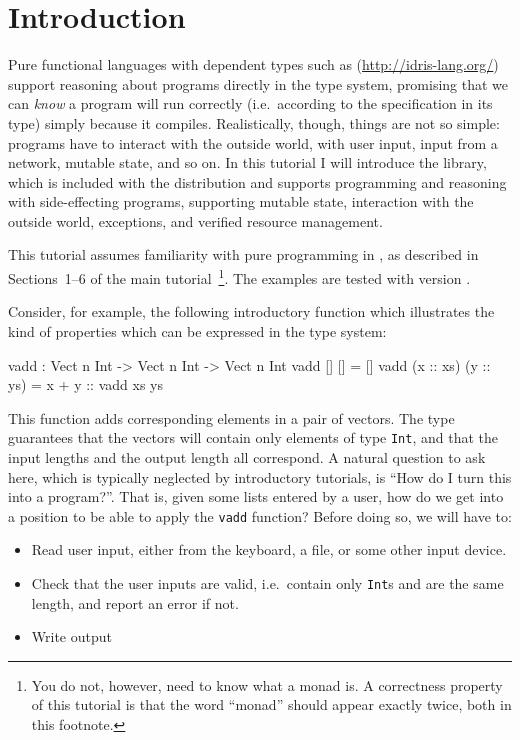 \section{Introduction}

Pure functional languages with dependent types such as \Idris{} (\url{http://idris-lang.org/}) support reasoning about programs directly in the type system, promising that we can \emph{know} a program will run correctly (i.e.\ according to the specification in its type) simply because it compiles.
Realistically, though, things are not so simple: programs have to interact with the outside world, with user input, input from a network, mutable state, and so on.
In this tutorial I will introduce the \effects{} library, which is included with the \Idris{} distribution and supports programming and reasoning with side-effecting programs, supporting mutable state, interaction with the outside world, exceptions, and verified resource management.

This tutorial assumes familiarity with pure programming in \Idris{}, as described in Sections~1--6 of the main tutorial~\cite{idris-tutorial}\footnote{You do not, however, need to know what a monad is. A correctness property of this tutorial is that the word ``monad'' should appear exactly twice, both in this footnote.}.
The examples are tested with \Idris{} version \version{}.

Consider, for example, the following introductory function which illustrates the kind of properties which can be expressed in the type system:

\begin{code}
vadd : Vect n Int -> Vect n Int -> Vect n Int
vadd []        []        = []
vadd (x :: xs) (y :: ys) = x + y :: vadd xs ys
\end{code}

This function adds corresponding elements in a pair of vectors.
The type guarantees that the vectors will contain only elements of type \texttt{Int}, and that the input lengths and the output length all correspond.
A natural question to ask here, which is typically neglected by introductory tutorials, is ``How do I turn this into a program?''.
That is, given some lists entered by a user, how do we get into a position to be able to apply the  \texttt{vadd} function? Before doing so, we will have to:

\begin{itemize}
\item Read user input, either from the keyboard, a file, or some other input device.
\item Check that the user inputs are valid, i.e.\ contain only \texttt{Int}s and are the same length, and report an error if not.
\item Write output
\end{itemize}


